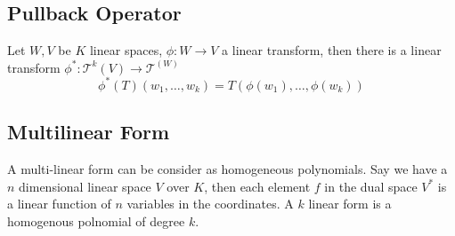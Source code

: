 \subsection{Pullback Operator}
Let $W, V$ be $K$ linear spaces, $\phi : W \to V$ a linear transform,
then there is a linear transform $\phi^\ast : \mathcal T^k(V) \to \mathcal T^(W)$
$$\phi^\ast(T)(w_1, \dots, w_k) = T(\phi(w_1), \dots, \phi(w_k))$$

\subsection{Multilinear Form}
A multi-linear form can be consider as homogeneous polynomials.
Say we have a $n$ dimensional linear space $V$ over $K$, then each element $f$ in the dual space $V^\ast$ 
is a linear function of $n$ variables in the coordinates.
A $k$ linear form is a homogenous polnomial of degree $k$.

